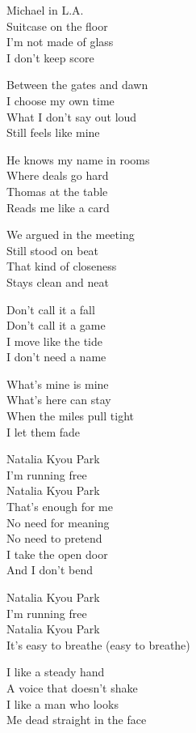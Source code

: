 \begin{lyrics}
Michael in L.A.\\
Suitcase on the floor\\
I’m not made of glass\\
I don’t keep score

Between the gates and dawn\\
I choose my own time\\
What I don’t say out loud\\
Still feels like mine

He knows my name in rooms\\
Where deals go hard\\
Thomas at the table\\
Reads me like a card

We argued in the meeting\\
Still stood on beat\\
That kind of closeness\\
Stays clean and neat

Don’t call it a fall\\
Don’t call it a game\\
I move like the tide\\
I don’t need a name

What’s mine is mine\\
What’s here can stay\\
When the miles pull tight\\
I let them fade

Natalia Kyou Park\\
I’m running free\\
Natalia Kyou Park\\
That’s enough for me\\
No need for meaning\\
No need to pretend\\
I take the open door\\
And I don’t bend

Natalia Kyou Park\\
I’m running free\\
Natalia Kyou Park\\
It’s easy to breathe (easy to breathe)

I like a steady hand\\
A voice that doesn’t shake\\
I like a man who looks\\
Me dead straight in the face


\end{lyrics}
